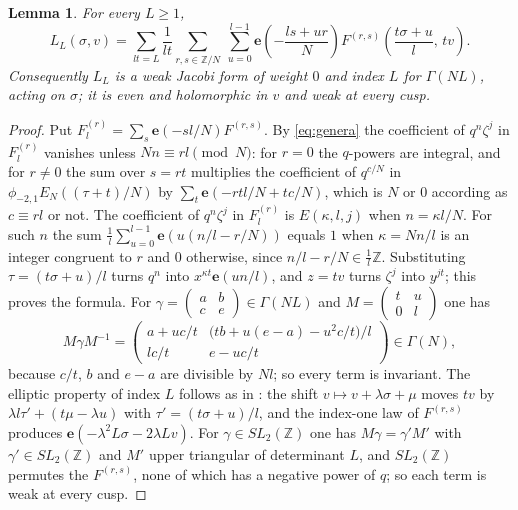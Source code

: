 \documentclass[mathematics,article,submit,pdftex,oneauthor]{Definitions/mdpi}
\numberwithin{equation}{section}
\theoremstyle{plain}
\newtheorem{lem}[thm]{Lemma}
\theoremstyle{remark}
\newcommand{\Z}{\mathbb{Z}}
\newcommand{\e}{\mathbf{e}}
\newcommand{\pmi}{\phi_{-2,1}}
\begin{document}
\begin{lem}\label{lem:hecke}
For every $L\ge1$,
\[
L_L(\sigma,v)=\sum_{lt=L}\frac{1}{lt}\sum_{r,s\in\Z/N}\ \sum_{u=0}^{l-1}\e\!\left(-\frac{ls+ur}{N}\right)F^{(r,s)}\!\left(\frac{t\sigma+u}{l},\,tv\right).
\]
Consequently $L_L$ is a weak Jacobi form of weight $0$ and index $L$ for $\Gamma(NL)$, acting on $\sigma$; it is even and holomorphic in $v$ and weak at every cusp.
\end{lem}

\begin{proof}
Put $F^{(r)}_l=\sum_s\e(-sl/N)F^{(r,s)}$. By \eqref{eq:genera} the coefficient of $q^n\zeta^j$ in $F^{(r)}_l$ vanishes unless $Nn\equiv rl\pmod N$: for $r=0$ the $q$-powers are integral, and for $r\ne0$ the sum over $s=rt$ multiplies the coefficient of $q^{c/N}$ in $\pmi E_N((\tau+t)/N)$ by $\sum_t\e(-rtl/N+tc/N)$, which is $N$ or $0$ according as $c\equiv rl$ or not. The coefficient of $q^n\zeta^j$ in $F^{(r)}_l$ is $E(\kappa,l,j)$ when $n=\kappa l/N$. For such $n$ the sum $\frac1l\sum_{u=0}^{l-1}\e(u(n/l-r/N))$ equals $1$ when $\kappa=Nn/l$ is an integer congruent to $r$ and $0$ otherwise, since $n/l-r/N\in\frac1l\Z$. Substituting $\tau=(t\sigma+u)/l$ turns $q^n$ into $x^{\kappa t}\e(un/l)$, and $z=tv$ turns $\zeta^j$ into $y^{jt}$; this proves the formula. For $\gamma=\left(\begin{smallmatrix}a&b\\c&e\end{smallmatrix}\right)\in\Gamma(NL)$ and $M=\left(\begin{smallmatrix}t&u\\0&l\end{smallmatrix}\right)$ one has
\[
M\gamma M^{-1}=\begin{pmatrix}a+uc/t& \bigl(tb+u(e-a)-u^2c/t\bigr)/l\\ lc/t& e-uc/t\end{pmatrix}\in\Gamma(N),
\]
because $c/t$, $b$ and $e-a$ are divisible by $Nl$; so every term is invariant. The elliptic property of index $L$ follows as in \cite[Lemma~1]{Bha26a}: the shift $v\mapsto v+\lambda\sigma+\mu$ moves $tv$ by $\lambda l\tau'+(t\mu-\lambda u)$ with $\tau'=(t\sigma+u)/l$, and the index-one law of $F^{(r,s)}$ produces $\e(-\lambda^2L\sigma-2\lambda Lv)$. For $\gamma\in SL_2(\Z)$ one has $M\gamma=\gamma'M'$ with $\gamma'\in SL_2(\Z)$ and $M'$ upper triangular of determinant $L$, and $SL_2(\Z)$ permutes the $F^{(r,s)}$, none of which has a negative power of $q$; so each term is weak at every cusp.
\end{proof}
\end{document}
